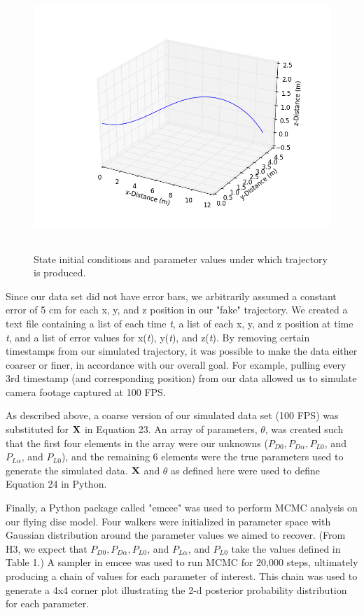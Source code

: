 \documentclass[a4paper,12pt, oneside]{article}
\begin{document}
\begin{figure}[H]
	\centering
	\includegraphics[width=16cm, height=10cm]{Simulated_throw_graph}
	\caption{\color{red}State initial conditions and parameter values under which trajectory is produced.\color{black}}
\end{figure}

Since our data set did not have error bars, we arbitrarily assumed a constant error of 5 cm for each x, y, and z position in our "fake" trajectory. We created a text file containing a list of each time \textit{t}, a list of each x, y, and z position at time \textit{t}, and a list of error values for x(\textit{t}), y(\textit{t}), and z(\textit{t}). By removing certain timestamps from our simulated trajectory, it was possible to make the data either coarser or finer, in accordance with our overall goal. For example, pulling every 3rd timestamp (and corresponding position) from our data  allowed us to simulate camera footage captured at 100 FPS.

As described above, a coarse version of our simulated data set (100 FPS) was substituted for $\bold{X}$ in Equation 23. An array of parameters, $\theta$, was created such that the first four elements in the array were our unknowns ($P_{D0}, P_{D\alpha}, P_{L0}$, and $P_{L\alpha}$, and $P_{L0}$), and the remaining 6 elements were the true parameters used to generate the simulated data. $\bold{X}$ and $\theta$ as defined here were used to define Equation 24 in Python.

Finally, a Python package called "emcee" was used to perform MCMC analysis on our flying disc model. Four walkers were initialized in parameter space with Gaussian distribution around the parameter values we aimed to recover. (From H3, we expect that $P_{D0}, P_{D\alpha}, P_{L0}$, and $P_{L\alpha}$, and $P_{L0}$ take the values defined in Table 1.) A sampler in emcee was used to run MCMC for 20,000 steps, ultimately producing a chain of values for each parameter of interest.  This chain was used to generate a 4x4 corner plot illustrating the 2-d posterior probability distribution for each parameter. 
\end{document}
